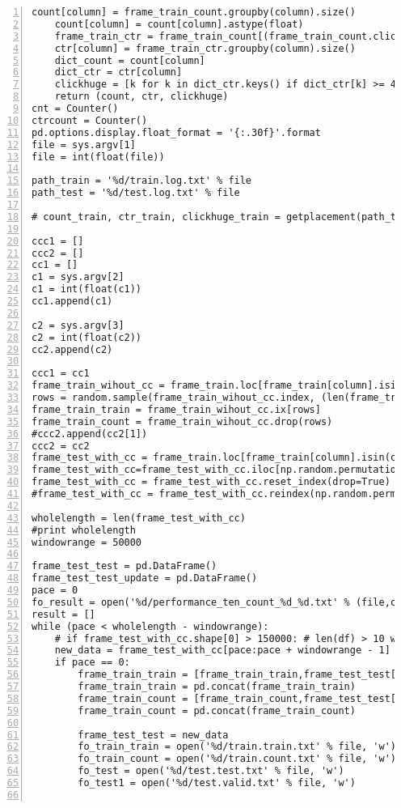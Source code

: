 \begin{lstlisting}[numbers=left, breaklines=true]
    count[column] = frame_train_count.groupby(column).size()
    count[column] = count[column].astype(float)
    frame_train_ctr = frame_train_count[(frame_train_count.click_count == 1)]
    ctr[column] = frame_train_ctr.groupby(column).size()
    dict_count = count[column]
    dict_ctr = ctr[column]
    clickhuge = [k for k in dict_ctr.keys() if dict_ctr[k] >= 400]
    return (count, ctr, clickhuge)
cnt = Counter()
ctrcount = Counter()
pd.options.display.float_format = '{:.30f}'.format
file = sys.argv[1]
file = int(float(file))

path_train = '%d/train.log.txt' % file
path_test = '%d/test.log.txt' % file

# count_train, ctr_train, clickhuge_train = getplacement(path_train)

ccc1 = []
ccc2 = []
cc1 = []
c1 = sys.argv[2]
c1 = int(float(c1))
cc1.append(c1)

c2 = sys.argv[3]
c2 = int(float(c2))
cc2.append(c2)

ccc1 = cc1
frame_train_wihout_cc = frame_train.loc[frame_train[column].isin(ccc1)]
rows = random.sample(frame_train_wihout_cc.index, (len(frame_train_wihout_cc.index) / 3))
frame_train_train = frame_train_wihout_cc.ix[rows]
frame_train_count = frame_train_wihout_cc.drop(rows)
#ccc2.append(cc2[1])
ccc2 = cc2
frame_test_with_cc = frame_train.loc[frame_train[column].isin(ccc2)]
frame_test_with_cc=frame_test_with_cc.iloc[np.random.permutation(len(frame_test_with_cc))]
frame_test_with_cc = frame_test_with_cc.reset_index(drop=True)
#frame_test_with_cc = frame_test_with_cc.reindex(np.random.permutation(frame_test_with_cc.index))

wholelength = len(frame_test_with_cc)
#print wholelength
windowrange = 50000                          

frame_test_test = pd.DataFrame()
frame_test_test_update = pd.DataFrame()
pace = 0
fo_result = open('%d/performance_ten_count_%d_%d.txt' % (file,c1,c2), 'w')
result = []
while (pace < wholelength - windowrange):
    # if frame_test_with_cc.shape[0] > 150000: # len(df) > 10 would also work
    new_data = frame_test_with_cc[pace:pace + windowrange - 1]
    if pace == 0:
        frame_train_train = [frame_train_train,frame_test_test[:windowrange/3]]
        frame_train_train = pd.concat(frame_train_train)
        frame_train_count = [frame_train_count,frame_test_test[(windowrange/3)+1:]]
        frame_train_count = pd.concat(frame_train_count)

        frame_test_test = new_data
        fo_train_train = open('%d/train.train.txt' % file, 'w')
        fo_train_count = open('%d/train.count.txt' % file, 'w')
        fo_test = open('%d/test.test.txt' % file, 'w')
        fo_test1 = open('%d/test.valid.txt' % file, 'w')


\end{lstlisting}
